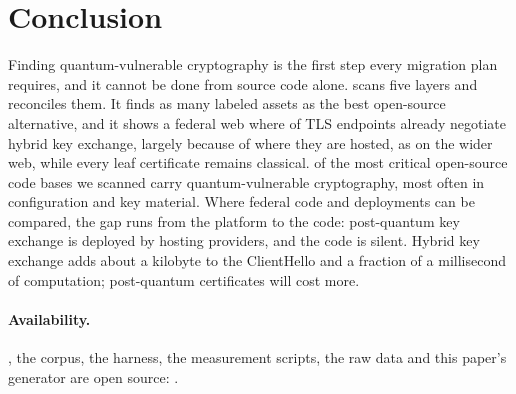 \section{Conclusion}

Finding quantum-vulnerable cryptography is the first step every migration
plan requires, and it cannot be done from source code alone. \tool{} scans
five layers and reconciles them. It finds  as many
labeled assets as the best open-source alternative, and it shows a federal web
where  of TLS endpoints already negotiate hybrid key
exchange, largely because of where they are hosted, as on the wider web,
while every leaf
certificate remains classical.  of the most critical open-source
code bases we scanned carry quantum-vulnerable cryptography, most often in configuration and key
material. Where federal code and deployments can be compared, the gap runs from
the platform to the code: post-quantum key exchange is deployed by hosting
providers, and the code is silent. Hybrid key exchange adds about a kilobyte to the ClientHello and a fraction
of a millisecond of computation; post-quantum certificates will cost more.

\paragraph{Availability.} \tool{}, the corpus, the harness, the measurement
scripts, the raw data and this paper's generator are open source:
\artifactlink.
